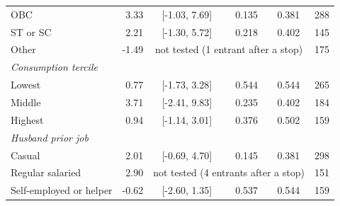 \begin{tabular}{lrcccr}
\quad OBC & 3.33 & [-1.03, 7.69] & 0.135 & 0.381 & 288 \\
\quad ST or SC & 2.21 & [-1.30, 5.72] & 0.218 & 0.402 & 145 \\
\quad Other & -1.49 & \multicolumn{3}{c}{not tested (1 entrant after a stop)} & 175 \\
\multicolumn{6}{l}{\textit{Consumption tercile}} \\
\quad Lowest & 0.77 & [-1.73, 3.28] & 0.544 & 0.544 & 265 \\
\quad Middle & 3.71 & [-2.41, 9.83] & 0.235 & 0.402 & 184 \\
\quad Highest & 0.94 & [-1.14, 3.01] & 0.376 & 0.502 & 159 \\
\multicolumn{6}{l}{\textit{Husband prior job}} \\
\quad Casual & 2.01 & [-0.69, 4.70] & 0.145 & 0.381 & 298 \\
\quad Regular salaried & 2.90 & \multicolumn{3}{c}{not tested (4 entrants after a stop)} & 151 \\
\quad Self-employed or helper & -0.62 & [-2.60, 1.35] & 0.537 & 0.544 & 159 \\
\bottomrule
\end{tabular}

